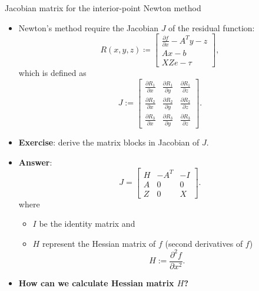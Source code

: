 %
%
\begin{frame}{Jacobian matrix for the interior-point Newton method}
%
\lcol
\begin{itemize}
\item Newton's method require the Jacobian $J$ of the residual function:
\[
R(x,y,z)
\coloneqq\begin{bmatrix}
\frac{\partial f}{\partial x}-A^{T}y-z\\
Ax-b\\
XZe-\tau
\end{bmatrix},
\]
which is defined as  
\[
J :=\begin{bmatrix}
\frac{\partial R_1}{\partial x} & \frac{\partial R_1}{\partial y} & \frac{\partial R_1}{\partial z}\\
\frac{\partial R_2}{\partial x} & \frac{\partial R_2}{\partial y} & \frac{\partial R_2}{\partial z}\\
\frac{\partial R_3}{\partial x} & \frac{\partial R_3}{\partial y} &\frac{\partial R_3}{\partial z}
\end{bmatrix}.
\]
%
\pause
\item \alert{\textbf{Exercise}}: derive the matrix blocks in Jacobian of $J$.
\end{itemize}
\rcol
\hiddenpause
\begin{itemize}
	\item \alert{\bf Answer}:
	\[
	J
	=\begin{bmatrix}
			H & -A^{T} & -I\\
			A & 0 & 0\\
			Z & 0 & X
		\end{bmatrix}.
	\]
where 
\begin{itemize}
	\item $I$ be the identity matrix and
	\item $H$ represent the Hessian matrix of $f$ (second derivatives of $f$)
	\[
	H :=
	\frac{\partial^{2}f}{\partial x^{2}}.
	\]
\end{itemize}
%
\pause
\item \alert{\bf How can we calculate Hessian matrix $H$?}
\end{itemize}

\ecol
\end{frame}
%
